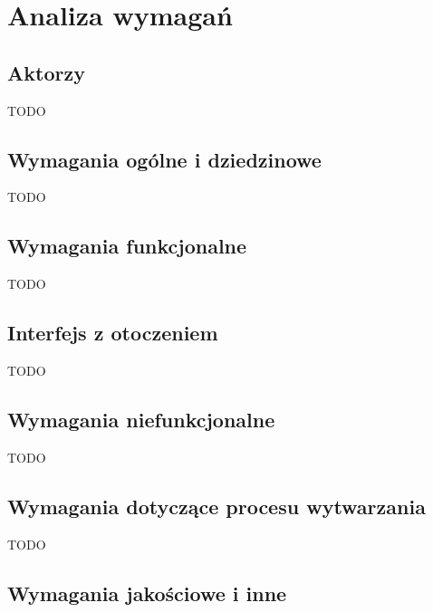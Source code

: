 
\chapter{Analiza wymagań}
\label{ch:analiza-wymagan}

\section{Aktorzy}
\label{sec:aktorzy}

TODO

\section{Wymagania ogólne i dziedzinowe}
\label{sec:wymagania-ogolne-i-dziedzinowe}

TODO

\section{Wymagania funkcjonalne}
\label{sec:wymagania-funkcjonalne}

TODO

\section{Interfejs z otoczeniem}
\label{sec:interfejs-z-otoczeniem}

TODO

\section{Wymagania niefunkcjonalne}
\label{sec:wymagania-niefunkcjonalne}

TODO

\section{Wymagania dotyczące procesu wytwarzania}
\label{sec:wymagania-dotyczace-procesu-wytwarzania}

TODO

\section{Wymagania jakościowe i inne}
\label{sec:wymagania-jakosciowe-i-inne}
